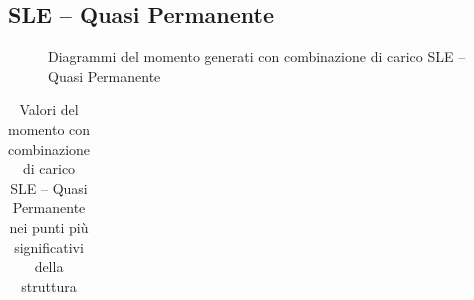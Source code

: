 \begin{landscape}
\subsection*{SLE -- Quasi Permanente}
\begin{figure}[H]
\centering
{} 
\caption{Diagrammi del momento generati con combinazione di carico SLE -- Quasi Permanente}
\label{fig:Momenti_SLSquasiPermanent}
\end{figure}
\begin{table}[H]
\centering
\caption{Valori del momento con combinazione di carico SLE -- Quasi Permanente nei punti più significativi della struttura}
	\begin{tabular}{lS[table-format=3.2]S[table-format=3.2]S[table-format=3.2]S[table-format=3.2]S[table-format=3.2]S[table-format=3.2]S[table-format=3.2]S[table-format=3.2]S[table-format=3.2]S[table-format=3.2]S[table-format=3.2]S[table-format=3.2]S[table-format=3.2]}

\end{tabular}
\end{table}
\end{landscape}
